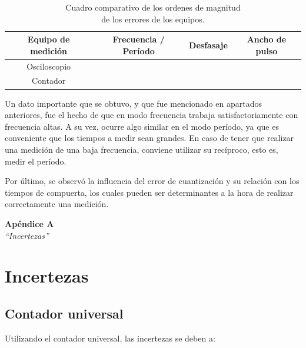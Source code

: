 \documentclass{article}
\begin{document}
\begin{table}[!hbt]
	\begin{center}
		\begin{tabular}{|c|c|c|c|} \hline
			\textbf{Equipo de medición} & \textbf{Frecuencia / Período} & \textbf{Desfasaje} & \textbf{Ancho de pulso} \\\hline
			Osciloscopio &  &  &  \\\hline
			Contador &  &  &  \\\hline
		\end{tabular}

	\caption{Cuadro comparativo de los ordenes de magnitud\\ de los errores de los equipos.}
	\end{center}
\end{table}
\bigskip


	Un dato importante que se obtuvo, y que fue mencionado en apartados anteriores, fue el hecho de que en modo frecuencia trabaja satisfactoriamente con frecuencia altas. A su vez, ocurre algo similar en el modo período, ya que es conveniente que los tiempos a medir sean grandes. En caso de tener que realizar una medición de una baja frecuencia, conviene utilizar su recíproco, esto es, medir el período.
	\par
	Por último, se observó la influencia del error de cuantización y su relación con los tiempos de compuerta, los cuales pueden ser determinantes a la hora de realizar correctamente una medición.


	


\newpage \textit{}
\newpage



\newpage
\vspace*{4cm}
\begin{center}
	\textbf{\Huge{Apéndice A}} \\
	\bigskip\bigskip
	\Large{\textit{``Incertezas''}}
\end{center}


\newpage \textit{}

\section{Incertezas}

\subsection{\textbf{Contador universal}} Utilizando el contador universal, las incertezas se deben a:\\
\end{document}
